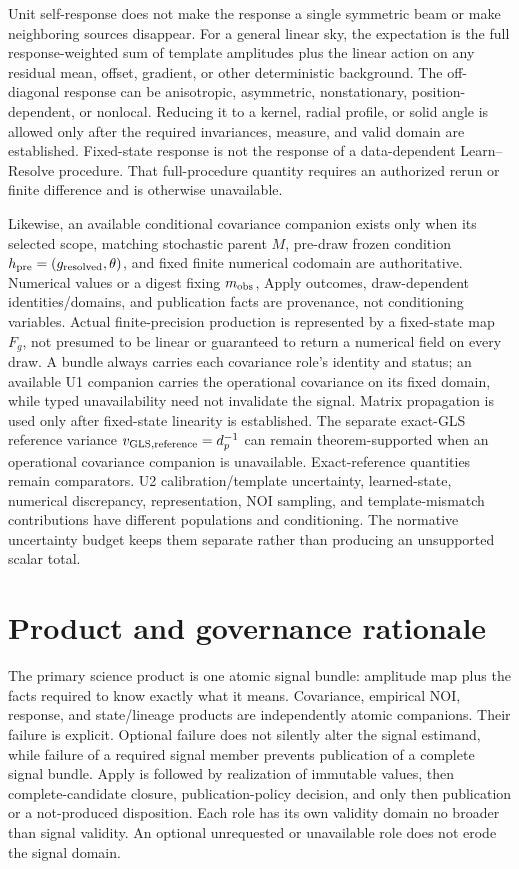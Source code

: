 \documentclass[11pt]{article}
\begin{document}
Unit self-response does not make the response a single symmetric beam or make
neighboring sources disappear. For a general linear sky, the expectation is
the full response-weighted sum of template amplitudes plus the linear action on
any residual mean, offset, gradient, or other deterministic background. The
off-diagonal response can be anisotropic, asymmetric, nonstationary,
position-dependent, or nonlocal. Reducing it to a kernel, radial profile, or
solid angle is allowed only after the required invariances, measure, and valid
domain are established. Fixed-state response is not the response of a
data-dependent Learn--Resolve procedure. That full-procedure quantity requires
an authorized rerun or finite difference and is otherwise unavailable.

Likewise, an available conditional covariance companion exists only when its
selected scope, matching stochastic parent $M$, pre-draw frozen condition
$h_{\rm pre}=(g_{\rm resolved},\theta)$, and fixed finite numerical codomain
are authoritative. Numerical values or a digest fixing $m_{\rm obs}$, Apply
outcomes, draw-dependent identities/domains, and publication facts are
provenance, not conditioning variables. Actual
finite-precision production is represented by a fixed-state map $F_g$, not
presumed to be linear or guaranteed to return a numerical field on every
draw. A bundle always carries each covariance role's identity and status; an
available U1 companion carries the operational covariance on its fixed domain,
while typed unavailability need not invalidate the signal. Matrix propagation
is used only after fixed-state linearity is established. The separate exact-GLS
reference variance $v_{\rm GLS,reference}=d_p^{-1}$ can remain theorem-supported
when an operational covariance companion is unavailable. Exact-reference
quantities remain comparators. U2 calibration/template uncertainty,
learned-state, numerical discrepancy,
representation, NOI sampling, and template-mismatch contributions have
different populations and conditioning. The normative uncertainty budget
keeps them separate rather than producing an unsupported scalar total.

\section{Product and governance rationale}

The primary science product is one atomic signal bundle: amplitude map plus
the facts required to know exactly what it means. Covariance, empirical NOI,
response, and state/lineage products are independently atomic companions.
Their failure is explicit. Optional failure does not silently alter the signal
estimand, while failure of a required signal member prevents publication of a
complete signal bundle. Apply is followed by realization of immutable values,
then complete-candidate closure, publication-policy decision, and only then
publication or a not-produced disposition.
Each role has its own validity domain no broader than signal validity. An
optional unrequested or unavailable role does not erode the signal domain.
\end{document}

